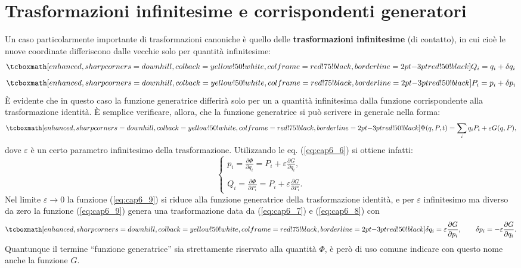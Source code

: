 \section[Trasformazioni infinitesime e corrispondenti generatori]{Trasformazioni infinitesime e corrispondenti generatori}
Un caso particolarmente importante di trasformazioni canoniche è quello delle \textbf{trasformazioni infinitesime} (di contatto), in cui cioè le nuove coordinate differiscono dalle vecchie solo per quantità infinitesime:
	\begin{equation}
		\tcboxmath[enhanced,sharp corners=downhill ,colback=yellow!50!white,colframe=red!75!black, borderline={2pt}{-3pt}{red!50!black}]{
			Q_i = q_i + \delta q _i
			}
		\label{eq:cap6_7}
	\end{equation}
	\begin{equation}
		\tcboxmath[enhanced,sharp corners=downhill ,colback=yellow!50!white,colframe=red!75!black, borderline={2pt}{-3pt}{red!50!black}]{
			P_i = p_i + \delta p _i
			}
		\label{eq:cap6_8} 
	\end{equation}
È evidente che in questo caso la funzione generatrice differirà solo per un a quantità infinitesima dalla funzione corrispondente alla trasformazione identità. È semplice verificare, allora, che la funzione generatrice si può scrivere in generale nella forma:
	\begin{equation}
		\tcboxmath[enhanced,sharp corners=downhill ,colback=yellow!50!white,colframe=red!75!black, borderline={2pt}{-3pt}{red!50!black}]{
			\Phi(q, P, t) = \sum _i q_iP_i +\varepsilon G(q, P) ,
			}
		\label{eq:cap6_9}
	\end{equation}
dove $\varepsilon $ è un certo parametro infinitesimo della trasformazione. Utilizzando le eq. (\ref{eq:cap6_6}) si ottiene infatti:
	\begin{equation}
		\begin{cases}
		\displaystyle{p_i= \frac{\partial \Phi}{\partial q_i} = P_i + \varepsilon \frac{\partial G}{\partial q_i }, }\\
		\\
		\displaystyle{Q_i= \frac{\partial \Phi}{\partial P_i} = P_i + \varepsilon \frac{\partial G}{\partial P_i }.}
		\end{cases}
	\end{equation}
Nel limite $\varepsilon \rightarrow 0$ la funzione (\ref{eq:cap6_9}) si riduce alla funzione generatrice della trasformazione identità, e per $\varepsilon$ infinitesimo ma diverso da zero la funzione (\ref{eq:cap6_9}) genera una trasformazione data da (\ref{eq:cap6_7}) e (\ref{eq:cap6_8}) con
	\begin{equation}
		\tcboxmath[enhanced,sharp corners=downhill ,colback=yellow!50!white,colframe=red!75!black, borderline={2pt}{-3pt}{red!50!black}]{
			\delta q_i = \varepsilon \frac{\partial G}{\partial p_i },\qquad \delta p _i = -\varepsilon \frac{\partial G}{\partial q_i } .
			}
		\label{eq:cap6_11}
	\end{equation}	
Quantunque il termine  ``funzione generatrice''  sia strettamente riservato alla quantità $\Phi$, è però di uso comune indicare con questo nome anche la funzione $G$.\\

